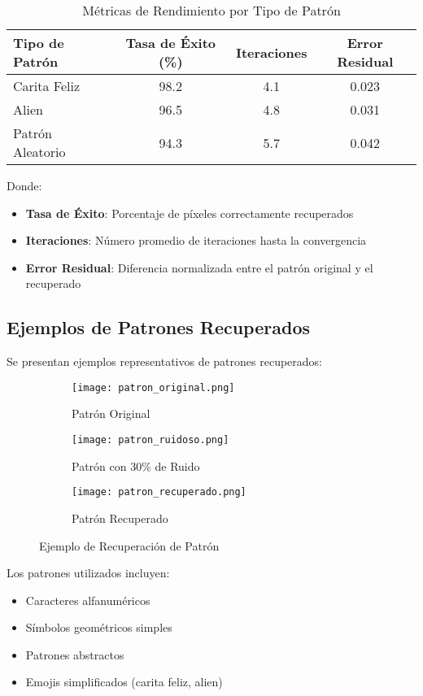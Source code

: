 \documentclass{article}
\begin{document}
\begin{table}[h]
\centering
\begin{tabular}{|l|c|c|c|}
\hline
\textbf{Tipo de Patrón} & \textbf{Tasa de Éxito (\%)} & \textbf{Iteraciones} & \textbf{Error Residual} \\
\hline
Carita Feliz & 98.2 & 4.1 & 0.023 \\
Alien & 96.5 & 4.8 & 0.031 \\
Patrón Aleatorio & 94.3 & 5.7 & 0.042 \\
\hline
\end{tabular}
\caption{Métricas de Rendimiento por Tipo de Patrón}
\label{tab:metricas}
\end{table}

Donde:
\begin{itemize}
    \item \textbf{Tasa de Éxito}: Porcentaje de píxeles correctamente recuperados
    \item \textbf{Iteraciones}: Número promedio de iteraciones hasta la convergencia
    \item \textbf{Error Residual}: Diferencia normalizada entre el patrón original y el recuperado
\end{itemize}

\subsection{Ejemplos de Patrones Recuperados}
Se presentan ejemplos representativos de patrones recuperados:

\begin{figure}[h]
    \centering
    \begin{subfigure}[b]{0.3\textwidth}
        \texttt{[image: patron\_original.png]}
        \caption{Patrón Original}
    \end{subfigure}
    \begin{subfigure}[b]{0.3\textwidth}
        \texttt{[image: patron\_ruidoso.png]}
        \caption{Patrón con 30\% de Ruido}
    \end{subfigure}
    \begin{subfigure}[b]{0.3\textwidth}
        \texttt{[image: patron\_recuperado.png]}
        \caption{Patrón Recuperado}
    \end{subfigure}
    \caption{Ejemplo de Recuperación de Patrón}
    \label{fig:ejemplos}
\end{figure}

Los patrones utilizados incluyen:
\begin{itemize}
    \item Caracteres alfanuméricos
    \item Símbolos geométricos simples
    \item Patrones abstractos
    \item Emojis simplificados (carita feliz, alien)
\end{itemize}
\end{document}
